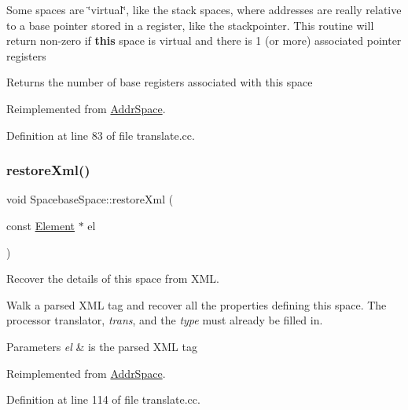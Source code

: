 Some spaces are \char`\"{}virtual\char`\"{}, like the stack spaces, where addresses are really relative to a base pointer stored in a register, like the stackpointer. This routine will return non-\/zero if {\bfseries{this}} space is virtual and there is 1 (or more) associated pointer registers \begin{DoxyReturn}{Returns}
the number of base registers associated with this space 
\end{DoxyReturn}


Reimplemented from \mbox{\hyperlink{class_addr_space_a1bc0bc963f33dedb721489497a92c2e3}{Addr\+Space}}.



Definition at line 83 of file translate.\+cc.

\mbox{\label{class_spacebase_space_adb45445a3286d78920f1c96074dd6229}} 
\subsubsection{\texorpdfstring{restoreXml()}{restoreXml()}}
{\footnotesize\ttfamily void Spacebase\+Space\+::restore\+Xml (\begin{DoxyParamCaption}\item[{const \mbox{\hyperlink{class_element}{Element}} $\ast$}]{el }\end{DoxyParamCaption})\hspace{0.3cm}{\ttfamily [virtual]}}



Recover the details of this space from X\+ML. 

Walk a parsed X\+ML tag and recover all the properties defining this space. The processor translator, {\itshape trans}, and the {\itshape type} must already be filled in. 
\begin{DoxyParams}{Parameters}
{\em el} & is the parsed X\+ML tag \\
\hline
\end{DoxyParams}


Reimplemented from \mbox{\hyperlink{class_addr_space_aa2fe50d288eef7ea713cce99774c4eca}{Addr\+Space}}.



Definition at line 114 of file translate.\+cc.

